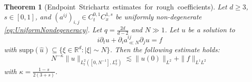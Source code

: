 \documentclass{amsart}
\newtheorem{theorem}{Theorem}[section]
\theoremstyle{definition}
\newcommand{\R}{\mathbb{R}}
\begin{document}
\begin{theorem}[Endpoint~Strichartz~estimates~for~rough~coefficients]
\label{thm:LinearStrichartzSEQ}
Let $d \geq 3$, $s \in [0,1]$, and $(a^{ij})_{i,j} \in C^{0,1}_t C^{1,s}_x$ be uniformly non-degenerate \eqref{eq:UniformNondegeneracy}. Let $q = \frac{2d}{d-2}$ and $N \gg 1$. Let $u$ be a solution to
\begin{equation*}
i \partial_t u + \partial_i a^{ij}_{\ll N} \partial_j u = f
\end{equation*}
with $\text{supp}(\hat{u}) \subseteq \{ \xi \in \R^d: |\xi| \sim N \}$. Then the following estimate holds:
\begin{equation}\label{Str-Schrodinger}
N^{-\kappa} \| u \|_{L_t^2([0,N^{-1}],L^q_x)} \lesssim \| u(0) \|_{L^2} + \| f \|_{L^1 L^2}
\end{equation}
with $\kappa = \frac{1-s}{2(3+s)}$.
\end{theorem}
\end{document}
